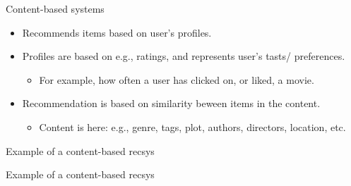 \begin{frame}
	\begin{block}{Content-based systems}
		\begin{itemize}
			\item <1-> Recommends items based on user's profiles. 
			\item <2-> Profiles are based on e.g., ratings, and represents user's tasts/ preferences. 
			\begin{itemize}
				\item <3-> For example, how often a user has clicked on, or liked, a movie. 
			\end{itemize}
			\item <4-> Recommendation is based on \alert{similarity} beween items in the content.
			\begin{itemize}
				\item <5-> Content is here: e.g., genre, tags, plot, authors, directors, location, etc. 
			\end{itemize}
		\end{itemize}
	\end{block}
\end{frame}

\begin{frame}{Example of a content-based recsys}
\end{frame}

\begin{frame}{Example of a content-based recsys}
\end{frame}





